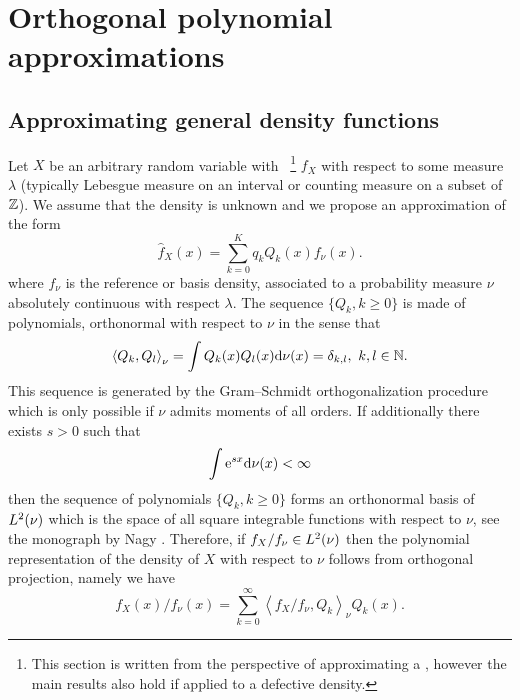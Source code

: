 \section{Orthogonal polynomial approximations}\label{sec:PolynomialApproximation}

\subsection{Approximating general density functions} \label{ssec:PolynomialApproxIntro}
Let $X$ be an arbitrary random variable with \pdf~\footnote{This section is written from the perspective of approximating a \pdf, however the main results also hold if applied to a defective density.} $f_X$ with respect to some measure $\lambda$ (typically Lebesgue measure on an interval or counting measure on a subset of $\mathbb{Z}$). We assume that the density is unknown and we propose an approximation of the form
\begin{equation}\label{eq:PolynomialApproximation}
\widehat{f}_{X}(x)=\sum_{k=0}^{K}q_{k}Q_{k}(x)f_{\nu}(x).
\end{equation}
where $f_{\nu}$ is the reference or basis density, associated to a probability measure $\nu$ absolutely continuous with respect $\lambda$. The sequence $\{Q_{k},k \geq 0\}$ is made of polynomials, orthonormal with respect to $\nu$ in the sense that
\begin{equation*}\label{eq:OrthonormalProperty}
\left<Q_{k},Q_{l}\right>_\nu =\int Q_{k}(x)Q_{l}(x)\mathrm{d}\nu(x)= \delta_{k,l},\text{ }k,l\in\mathbb N.
\end{equation*}
This sequence is generated by the Gram--Schmidt orthogonalization procedure %
which is only possible if $\nu$ admits moments of all orders. If additionally there exists $s>0$ such that
\begin{equation}
\int \mathrm{e}^{sx}\mathrm{d}\nu(x)<\infty\nonumber
\end{equation}
then the sequence of polynomials $\{Q_{k},k \geq 0\}$ forms an orthonormal basis of $L^2(\nu)$ which is the space of all square integrable functions with respect to $\nu$, see the monograph by Nagy \cite[Chapter 7]{Na65}. Therefore, if $f_{X}/f_{\nu}\in L^2(\nu)$ then the polynomial representation of the density of $X$ with respect to $\nu$ follows from orthogonal projection, namely we have
\begin{equation}\label{eq:PolynomialRepresentationTheory}
f_{X}(x)/f_{\nu}(x)=\sum_{k=0}^{\infty}\left<f_{X}/f_{\nu} , Q_{k}\right>_\nu Q_{k}(x).
\end{equation}
